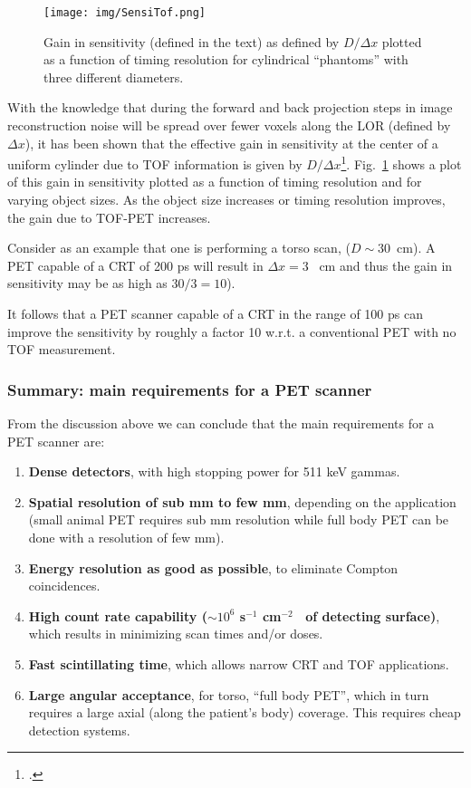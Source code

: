 \begin{figure}[!bhtp]
	\centering
	\texttt{[image: img/SensiTof.png]}
	\caption{\label{fig.sensi} Gain in sensitivity (defined in the text) as defined by $D/\Delta x$ plotted as a function of timing resolution for cylindrical ``phantoms'' with three different diameters.}
\end{figure}

With the knowledge that during the forward and back projection steps in image reconstruction noise will be spread over fewer voxels along the LOR (defined by $\Delta x$), it has been  shown  that the effective gain in sensitivity at the center of a uniform cylinder due to TOF information is given by $D/\Delta x$\footcite{snyder, budinger}. Fig.~\ref{fig.sensi} shows a plot of this gain in sensitivity plotted as a function of timing resolution and for varying object sizes. As the object size increases or timing resolution improves, the gain due to TOF-PET increases. 

Consider as an example that one is performing a torso scan, ($D \sim 30$~cm). A PET capable of a CRT of 200 ps will result in $\Delta x = 3$~ cm and thus the gain in sensitivity may be as high as $30/3 = 10$). 
  
It follows that a PET scanner capable of a CRT in the range of 100 ps can improve the sensitivity by roughly a factor 10 w.r.t. a conventional PET with no TOF measurement. 


\subsubsection*{Summary: main requirements for a PET scanner}

From the discussion above we can conclude that the 
main requirements for a PET scanner are: 

\begin{enumerate}
\item {\bf Dense detectors}, with high stopping power for 511 keV gammas.
\item {\bf Spatial resolution of sub mm to few mm}, depending on the application (small animal PET requires sub mm resolution while full body PET can be done with a resolution of few mm).
\item {\bf Energy resolution as good as possible}, to eliminate Compton coincidences.
\item {\bf High count rate capability ($\sim10^6$ s$^{-1}$ cm$^{-2}$~ of detecting surface)}, which results in minimizing scan times and/or doses.
\item {\bf Fast scintillating time}, which allows narrow CRT and TOF applications. 
\item {\bf Large angular acceptance}, for torso, ``full body PET'', which in turn requires a large axial (along the patient's body) coverage. This requires cheap detection systems. 
\end{enumerate}


